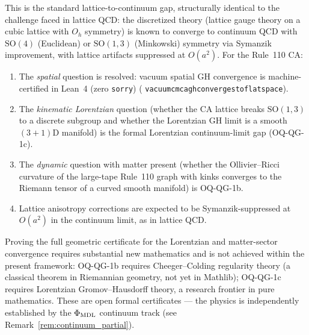 \documentclass[11pt]{article}
\theoremstyle{remark}
\newcommand{\lean}[1]{%
  \penalty-100
  \begingroup\def\_{\textunderscore\allowbreak}\texttt{#1}\endgroup}
\newcommand{\CatAL}{machine-certified in Lean~4 (zero \texttt{sorry})}
\begin{document}
This is the standard lattice-to-continuum gap, structurally identical to the
challenge faced in lattice QCD: the discretized theory (lattice gauge theory
on a cubic lattice with $O_h$ symmetry) is known to converge to continuum
QCD with $\mathrm{SO}(4)$ (Euclidean) or $\mathrm{SO}(1,3)$ (Minkowski)
symmetry via Symanzik improvement, with lattice artifacts suppressed at
$O(a^2)$.
For the Rule~110 CA:
\begin{enumerate}[leftmargin=2em]
\item The \emph{spatial} question is resolved: vacuum spatial GH convergence is
\CatAL{} (\lean{vacuum\_cmca\_gh\_converges\_to\_flat\_space}).
\item The \emph{kinematic Lorentzian} question (whether the CA lattice breaks
$\mathrm{SO}(1,3)$ to a discrete subgroup and whether the Lorentzian GH limit
is a smooth $(3{+}1)$D manifold) is the formal Lorentzian continuum-limit gap
(OQ-QG-1c).
\item The \emph{dynamic} question with matter present (whether the Ollivier--Ricci
curvature of the large-tape Rule~110 graph with kinks converges to the Riemann tensor
of a curved smooth manifold) is OQ-QG-1b.
\item Lattice anisotropy corrections are expected to be Symanzik-suppressed
at $O(a^2)$ in the continuum limit, as in lattice QCD.
\end{enumerate}
Proving the full geometric certificate for the Lorentzian and matter-sector convergence
requires substantial new mathematics and is not achieved within the present framework:
OQ-QG-1b requires Cheeger--Colding regularity theory (a classical theorem in
Riemannian geometry, not yet in Mathlib); OQ-QG-1c requires Lorentzian
Gromov--Hausdorff theory, a research frontier in pure mathematics.  These are open
formal certificates --- the physics is independently established by the
$\Phi_{\rm MDL}$ continuum track (see Remark~\ref{rem:continuum_partial}).
\end{document}

